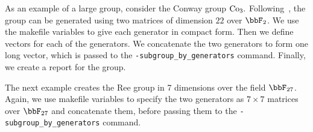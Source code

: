 As an example of a large group, consider the Conway group ${\rm Co}_3.$ 
Following~\cite{SuleimanWilson1997}, the group can be generated using two 
matrices of dimension $22$ over $\bbF_2$. 
We use the makefile variables to give each generator in compact form. 
Then we define vectors for each of the generators. 
We concatenate the two generators to 
form one long vector, 
which is passed to the \verb'-subgroup_by_generators' command.
Finally, we create a report for the group.
{\tt

}
{\tt

}
{\tt

}


\bigskip

The next example creates the Ree group 
in 7 dimensions over the field $\bbF_{27}$. 
Again, we use makefile variables to specify the 
two generators as $7 \times 7$ matrices over $\bbF_{27}$ 
and concatenate them, 
before passing them to the \verb'-subgroup_by_generators' command.
{\tt

}
{\tt

}
{\tt

}
 
